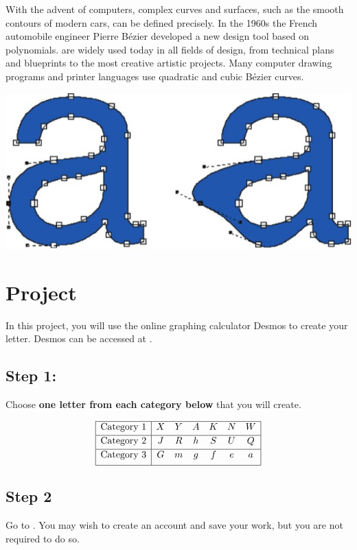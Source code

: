 \documentclass{ximera}
\begin{document}
With the advent of computers, complex curves and surfaces, such as the smooth contours of modern cars, can be defined precisely. In the 1960s the French automobile engineer Pierre Bézier developed a new design tool based on polynomials.  are widely used today in all fields of design, from technical plans and blueprints to the most creative artistic projects. Many computer drawing programs and printer languages use quadratic and cubic Bézier curves.

\begin{image}
\includegraphics{letterA.jpg}
\end{image}

\section{Project}

In this project, you will use the online graphing calculator Desmos to create your letter.  Desmos can be accessed at .  

\subsection{Step 1:} Choose \textbf{one letter from each category below} that you will create.

$$
 \begin{array}{|c | c c c c c c |} 
 \hline
 \text{Category 1} & X & Y & A & K & N & W \\ [0.5ex] 
 \hline
 \text{Category 2} & J & R & h & S & U & Q \\ [0.5ex] 
 \hline
 \text{Category 3} & G & m & g & f & e & a \\[1ex] 
 \hline
\end{array}
$$

\subsection{Step 2} Go to .  You may wish to create an account and save your work, but you are not required to do so.  
\end{document}
